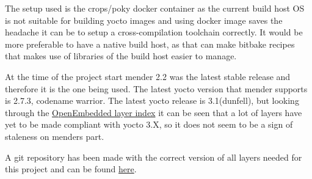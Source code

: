 \documentclass[../../main.tex]{subfiles}
\begin{document}
The setup used is the crops/poky docker container as the current build host OS is
not suitable for building yocto images and using docker image saves the headache it can be to
setup a cross-compilation toolchain correctly.
It would be more preferable to have a native build host, as that can make bitbake recipes
that makes use of libraries of the build host easier to manage.

At the time of the project start mender 2.2 was the latest stable release and therefore it
is the one being used.
The latest yocto version that mender supports is 2.7.3, codename warrior.
The latest yocto release is 3.1(dunfell), but looking through the
\href{https://layers.openembedded.org/layerindex/branch/master/layers/}{OpenEmbedded layer index}
it can be seen that a lot of layers have yet to be made compliant with yocto 3.X, so it does not
seem to be a sign of staleness on menders part.

A git repository has been made with the correct version of all layers needed for this project and
can be found \href{https://github.com/askebm/YoctoMenderMclurs.git}{here}.
\end{document}

